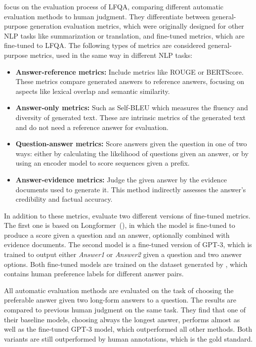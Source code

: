 \cite{xu:2023:A} focus on the evaluation process of LFQA, comparing different automatic evaluation methods to human judgment.
They differentiate between general-purpose generation evaluation metrics, which were originally designed for other NLP tasks like summarization or translation, and fine-tuned metrics, which are fine-tuned to LFQA.
The following types of metrics are considered general-purpose metrics, used in the same way in different NLP tasks:
\begin{itemize}
\item \textbf{Answer-reference metrics:} Include metrics like ROUGE or BERTScore. These metrics compare generated answers to reference answers, focusing on aspects like lexical overlap and semantic similarity.
\item \textbf{Answer-only metrics:} Such as Self-BLEU which measures the fluency and diversity of generated text. These are intrinsic metrics of the generated text and do not need a reference answer for evaluation.
\item \textbf{Question-answer metrics:} Score answers given the question in one of two ways: either by calculating the likelihood of questions given an answer, or by using an encoder model to score sequences given a prefix.
\item \textbf{Answer-evidence metrics:} Judge the given answer by the evidence documents used to generate it. This method indirectly assesses the answer's credibility and factual accuracy.
\end{itemize}
In addition to these metrics, \cite{xu:2023:A} evaluate two different versions of fine-tuned metrics.
The first one is based on Longformer~(\cite{beltagy:2020:Longformer}), in which the model is fine-tuned to produce a score given a question and an answer, optionally combined with evidence documents.
The second model is a fine-tuned version of GPT-3, which is trained to output either \emph{Answer1} or \emph{Answer2} given a question and two answer options.
Both fine-tuned models are trained on the dataset generated by \cite{nakano:2021:Webgpt}, which contains human preference labels for different answer pairs.

All automatic evaluation methods are evaluated on the task of choosing the preferable answer given two long-form answers to a question.
The results are compared to previous human judgment on the same task.
They find that one of their baseline models, choosing always the longest answer, performs almost as well as the fine-tuned GPT-3 model, which outperformed all other methods.
Both variants are still outperformed by human annotations, which is the gold standard.

